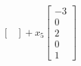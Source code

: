 \begin{eg}
\[\begin{bmatrix}
    \end{bmatrix} + x_5 \begin{bmatrix}
        -3 \\ 0 \\ 2 \\ 0 \\ 1
    \end{bmatrix} \]
\end{eg}

